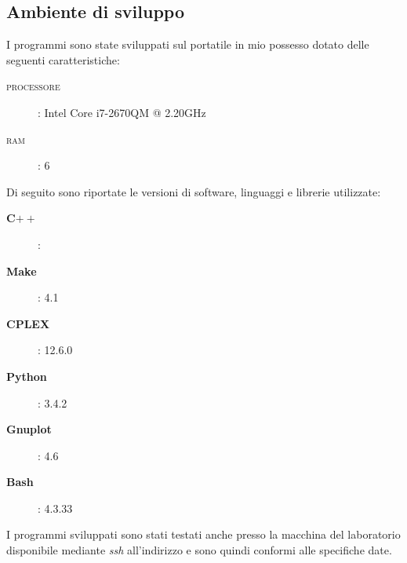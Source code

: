 \subsection{Ambiente di sviluppo}
\label{sec:ambiente}
I programmi sono state sviluppati sul  portatile in mio possesso dotato delle seguenti caratteristiche:
\begin{description}
\item[\textsc{processore}]: Intel Core i7-2670QM @ 2.20GHz
\item[\textsc{ram}]: 6
\end{description}

Di seguito sono riportate le versioni di software, linguaggi e librerie utilizzate:
\begin{description}
\item[\textbf{C$++$}]: 
\item[\textbf{Make}]: 4.1
\item[\textbf{CPLEX}]: 12.6.0
\item[\textbf{Python}]: 3.4.2
\item[\textbf{Gnuplot}]: 4.6
\item[\textbf{Bash}]: 4.3.33
\end{description}

I programmi sviluppati sono stati testati anche presso la macchina del laboratorio disponibile mediante \emph{ssh} all'indirizzo  e sono quindi conformi alle specifiche date.